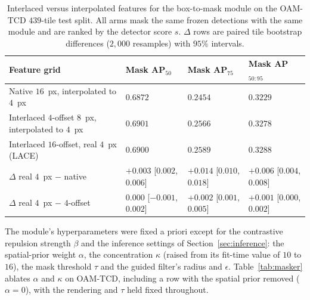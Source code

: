 \documentclass[remotesensing,article,submit,moreauthors]{Definitions/mdpi}
\begin{document}
\begin{table}[H]
\caption{Interlaced versus interpolated features for the box-to-mask module on the OAM-TCD $439$-tile test split. All arms mask the same frozen detections with the same module and are ranked by the detector score $s$. $\Delta$ rows are paired tile bootstrap differences ($2{,}000$ resamples) with $95\%$ intervals. \label{tab:grid}}
\begin{tabularx}{\textwidth}{lCCC}
\toprule
\textbf{Feature grid} & \textbf{Mask AP$_{50}$} & \textbf{Mask AP$_{75}$} & \textbf{Mask AP$_{50:95}$} \\
\midrule
Native $16$~px, interpolated to $4$~px & $0.6872$ & $0.2454$ & $0.3229$ \\
Interlaced $4$-offset $8$~px, interpolated to $4$~px & $\mathbf{0.6901}$ & $0.2566$ & $0.3278$ \\
Interlaced $16$-offset, real $4$~px (LACE) & $0.6900$ & $\mathbf{0.2589}$ & $\mathbf{0.3288}$ \\
\midrule
$\Delta$ real $4$~px $-$ native & $+0.003$ {\scriptsize [$0.002$, $0.006$]} & $+0.014$ {\scriptsize [$0.010$, $0.018$]} & $+0.006$ {\scriptsize [$0.004$, $0.008$]} \\
$\Delta$ real $4$~px $-$ $4$-offset & $0.000$ {\scriptsize [$-0.001$, $0.002$]} & $+0.002$ {\scriptsize [$0.001$, $0.005$]} & $+0.001$ {\scriptsize [$0.000$, $0.002$]} \\
\bottomrule
\end{tabularx}
\end{table}


The module's hyperparameters were fixed a priori except for the contrastive repulsion strength $\beta$ and the inference settings of Section~\ref{sec:inference}: the spatial-prior weight $\alpha$, the concentration $\kappa$ (raised from its fit-time value of $10$ to $16$), the mask threshold $\tau$ and the guided filter's radius and $\epsilon$. Table~\ref{tab:masker} ablates $\alpha$ and $\kappa$ on OAM-TCD, including a row with the spatial prior removed ($\alpha = 0$), with the rendering and $\tau$ held fixed throughout.
\end{document}
